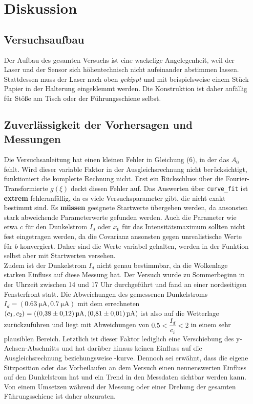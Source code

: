 \section{Diskussion}
\label{sec:Diskussion}

\subsection{Versuchsaufbau}
Der Aufbau des gesamten Versuchs ist eine wackelige Angelegenheit, weil der Laser und der Sensor sich höhentechnisch nicht aufeinander abstimmen lassen.
Stattdessen muss der Laser nach oben \textit{gekippt} und mit beispielsweise einem Stück Papier in der Halterung eingeklemmt werden.
Die Konstruktion ist daher anfällig für Stöße am Tisch oder der Führungsschiene selbst.

\subsection{Zuverlässigkeit der Vorhersagen und Messungen}
Die Versuchsanleitung hat einen kleinen Fehler in Gleichung (6), in der das $A_0$ fehlt. Wird dieser variable Faktor in der Ausgleichsrechnung nicht berücksichtigt,
funktioniert die komplette Rechnung nicht.
Erst ein Rückschluss über die Fourier-Transformierte $g(\xi)$ deckt diesen Fehler auf.
Das Auswerten über \texttt{curve\_fit} ist \textbf{extrem} fehleranfällig, da es viele Versuchsparameter gibt, die nicht exakt bestimmt sind.
Es \textbf{müssen} geeignete Startwerte übergeben werden, da ansonsten stark abweichende Parameterwerte gefunden werden.
Auch die Parameter wie etwa $c$ für den Dunkelstrom $I_d$ oder $x_0$ für das Intensitätsmaximum sollten nicht fest eingetragen werden, da die Covarianz ansonsten gegen
unrealistische Werte für $b$ konvergiert. Daher sind die Werte variabel gehalten, werden in der Funktion selbst aber mit Startwerten versehen. \\

Zudem ist der Dunkelstrom $I_d$ nicht genau bestimmbar, da die Wolkenlage starken Einfluss auf diese Messung hat. Der Versuch wurde zu Sommerbeginn in der Uhrzeit zwischen
14 und 17 Uhr durchgeführt und fand an einer nordseitigen Fensterfront statt.
Die Abweichungen des gemessenen Dunkelstroms $I_d = (\SI{0.63}{\micro\ampere}, \SI{0.7}{\micro\ampere}) $ mit dem errechneten $(c_1, c_2) = (\SI{0.38\pm0.12}{\micro\ampere}, \SI{0.81\pm0.01}{\micro\ampere})$
ist also auf die Wetterlage zurückzuführen und liegt mit Abweichungen von $0.5 < \dfrac{I_d}{c_i} < 2$ in einem sehr plausiblen Bereich.
Letztlich ist dieser Faktor lediglich eine Verschiebung des y-Achsen-Abschnitts und hat darüber hinaus keinen Einfluss auf die Ausgleichsrechnung beziehungsweise -kurve.
Dennoch sei erwähnt, dass die eigene Sitzposition oder das Vorbeilaufen an dem Versuch einen nennenswerten Einfluss auf den Dunkelstrom hat und ein Trend in den Messdaten sichtbar werden kann.
Von einem Umsetzen während der Messung oder einer Drehung der gesamten Führungsschiene ist daher abzuraten.

